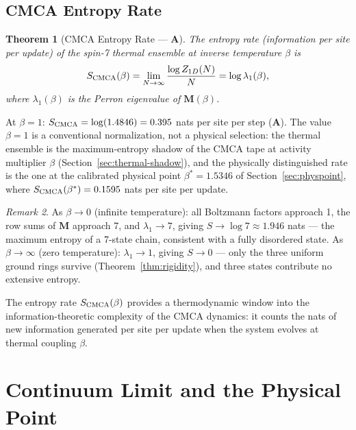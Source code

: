 \documentclass[11pt]{article}
\newtheorem{theorem}{Theorem}[section]
\theoremstyle{remark}
\newtheorem{remark}[theorem]{Remark}
\newcommand{\CatA}{\textbf{A}}
\begin{document}
\subsection{CMCA Entropy Rate}

\begin{theorem}[CMCA Entropy Rate --- \CatA{}]
\label{thm:entropyrate}
The entropy rate (information per site per update) of the spin-7 thermal
ensemble at inverse temperature $\beta$ is
\begin{equation}
  S_{\rm CMCA}(\beta) = \lim_{N \to \infty} \frac{\log Z_{1D}(N)}{N} = \log \lambda_1(\beta),
\end{equation}
where $\lambda_1(\beta)$ is the Perron eigenvalue of $\mathbf{M}(\beta)$.
\end{theorem}

At $\beta = 1$: $S_{\rm CMCA} = \log(1.4846) = 0.395$ nats per site per step
(\CatA{}). The value $\beta = 1$ is a conventional normalization, not a
physical selection: the thermal ensemble is the maximum-entropy shadow of the
CMCA tape at activity multiplier $\beta$ (Section~\ref{sec:thermal-shadow}),
and the physically distinguished rate is the one at the calibrated physical
point $\beta^* = 1.5346$ of Section~\ref{sec:physpoint}, where
$S_{\rm CMCA}(\beta^*) = 0.1595$ nats per site per update.

\begin{remark}
As $\beta \to 0$ (infinite temperature): all Boltzmann factors approach 1, the
row sums of $\mathbf{M}$ approach 7, and $\lambda_1 \to 7$, giving
$S \to \log 7 \approx 1.946$ nats --- the maximum entropy of a 7-state chain,
consistent with a fully disordered state. As $\beta \to \infty$ (zero
temperature): $\lambda_1 \to 1$, giving $S \to 0$ --- only the three uniform
ground rings survive (Theorem~\ref{thm:rigidity}), and three states contribute
no extensive entropy.
\end{remark}

The entropy rate $S_{\rm CMCA}(\beta)$ provides a thermodynamic window into the
information-theoretic complexity of the CMCA dynamics: it counts the nats of new
information generated per site per update when the system evolves at thermal
coupling $\beta$.

\section{Continuum Limit and the Physical Point}
\label{sec:continuum}
\end{document}
